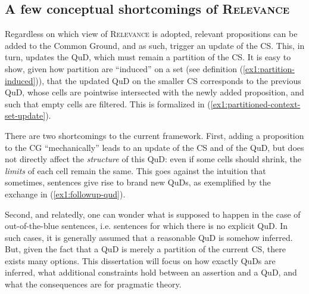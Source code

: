 \subsection{A few conceptual shortcomings of \textsc{Relevance}}

Regardless on which view of \textsc{Relevance} is adopted, relevant propositions can be added to the Common Ground, and as such, trigger an update of the CS. This, in turn, updates the QuD, which must remain a partition of the CS. It is easy to show, given how partition are ``induced'' on a set (see definition (\ref{ex1:partition-induced})), that the updated QuD on the smaller CS corresponds to the previous QuD, whose cells are pointwise intersected with the newly added proposition, and such that empty cells are filtered. This is formalized in (\ref{ex1:partitioned-context-set-update}).

\begin{exe}
	\label{ex1:partitioned-context-set-update}
\end{exe}

There are two shortcomings to the current framework. First, adding a proposition to  the CG ``mechanically'' leads to an update of the CS and of the QuD, but does not directly affect the \textit{structure} of this QuD: even if some cells should shrink, the \textit{limits} of each cell remain the same. This goes against the intuition that sometimes, sentences give rise to brand new QuDs, as exemplified by the exchange in (\ref{ex1:followup-qud}).

\begin{exe}
	\label{ex1:followup-qud}
\end{exe}


Second, and relatedly, one can wonder what is supposed to happen in the case of out-of-the-blue sentences, i.e. sentences for which there is no explicit QuD. In such cases, it is generally assumed that a reasonable QuD is somehow inferred. But, given the fact that a QuD is merely a partition of the current CS, there exists many options. This dissertation will focus on how exactly QuDs are inferred, what additional constraints hold between an assertion and a QuD, and what the consequences are for pragmatic theory.

